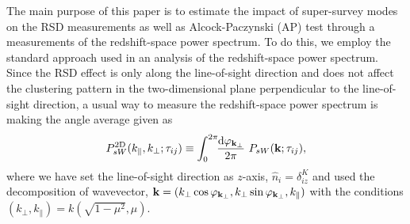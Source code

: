 \documentclass[prd,onecolumn,notitlepage,amsmath,amssymb,floatfix,superscriptaddress]{revtex4-1}
\newcommand{\bk}{{\bf k}}
\newcommand{\hn}{\hat{n}}
\begin{document}
The main purpose of this paper is to estimate the impact of super-survey modes on the RSD measurements as well as
Alcock-Paczynski (AP) test \cite{AlcockPaczynski:79} through a measurements of the redshift-space power spectrum. 
To do this, we employ the standard approach used in an analysis of the redshift-space power spectrum. Since the RSD
effect is only along the line-of-sight direction and does not affect the clustering pattern in the two-dimensional 
plane perpendicular to the line-of-sight direction, a usual way to measure the redshift-space power spectrum is making 
the angle average given as
%
\begin{equation}
{P}^{\rm 2D}_{sW}(k_\parallel,k_\perp; \tau_{ij})\equiv \int^{2\pi}_0\!\!\frac{\mathrm{d}\varphi_{\bk_\perp}}{2\pi}~{P}_{sW}(\bk;
\tau_{ij}),
\label{eq:p2d_def}
\end{equation}
%
where we have set the line-of-sight direction as $z$-axis, $\hn_i = \delta^K_{iz}$ and used the decomposition of wavevector, $\bk=(k_\perp \cos\varphi_{\bk_\perp},k_\perp\sin\varphi_{\bk_\perp},k_\parallel)$
with the conditions $(k_\perp,k_\parallel)=k\left(\sqrt{1-\mu^2},\mu\right)$. 
\end{document}
